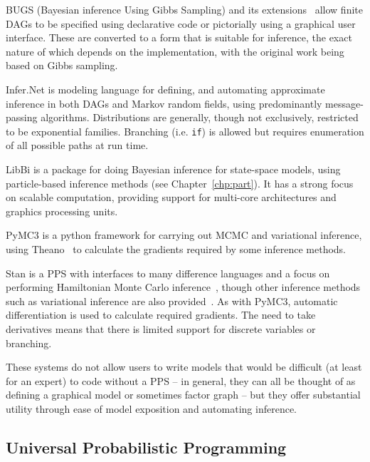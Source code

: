 BUGS (Bayesian inference Using Gibbs Sampling) \citep{spiegelhalter1996bugs} and its 
	extensions~\citep{lunn2000winbugs,plummer2003jags,todeschini2014biips}
	allow finite DAGs to be specified using declarative code or pictorially using a graphical user
	interface.  These are converted to a form that is suitable for inference, the exact nature of which
	depends on the implementation, with the original work being based on Gibbs sampling.
	
Infer.Net \citep{minka_software_2010} is modeling language for defining, and automating approximate inference in
	both DAGs and Markov random fields, using predominantly message-passing algorithms. Distributions
	are generally, though not exclusively, restricted to be exponential families.  Branching (i.e. \texttt{if}) 
	is allowed but requires enumeration of all possible paths at run time.

LibBi \citep{murray2013bayesian} is a package for doing Bayesian inference for state-space models,
	using particle-based inference methods (see Chapter~\ref{chp:part}).  It has a strong focus on scalable
	computation, providing support for multi-core architectures and graphics processing units.

PyMC3 \citep{salvatier2016probabilistic} is a python framework for carrying out MCMC and variational
	inference, using Theano~\citep{bergstra2010theano} to calculate the gradients required by some inference methods.

Stan \citep{carpenter2015stan} is a PPS with interfaces to many difference languages and a
	focus on performing Hamiltonian Monte Carlo inference~\citep{duane1987hybrid,hoffman2014no}, though
	other inference methods such as variational inference are also provided~\citep{kucukelbir2015automatic}.
	As with PyMC3, automatic differentiation is used to calculate required gradients.  The need to take
	derivatives means that there is limited support for discrete variables or branching.

These systems do not allow users to write models that would be difficult (at least for
an expert) to code without a PPS -- in general, they can all be thought of as defining a graphical model
or sometimes factor graph -- but they offer substantial utility through ease of model exposition and
automating inference.

\subsection{Universal Probabilistic Programming}
\label{sec:probprog:two:general}

